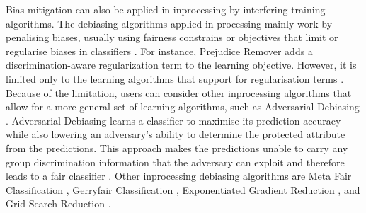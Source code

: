 \documentclass[sigconf,review]{acmart}
\begin{document}
	Bias mitigation can also be applied in inprocessing by interfering training algorithms. The debiasing algorithms applied in processing mainly work by penalising biases, usually using fairness constrains or objectives that limit or regularise biases in classifiers \cite{mahoney2020ai}. For instance, Prejudice Remover \cite{kamishima2012prejudice} adds a discrimination-aware regularization term to the learning objective. However, it is limited only to the learning algorithms that support for regularisation terms \cite{mahoney2020ai,ibmaif3602022guidance}. Because of the limitation, users can consider other inprocessing algorithms that allow for a more general set of learning algorithms, such as Adversarial Debiasing \cite{mahoney2020ai,ibmaif3602022guidance}. Adversarial Debiasing \cite{zhang2018adversarial} learns a classifier to maximise its prediction accuracy while also lowering an adversary's ability to determine the protected attribute from the predictions. This approach makes the predictions unable to carry any group discrimination information that the adversary can exploit and therefore leads to a fair classifier \cite{ibmaif3602022guidance}. Other inprocessing debiasing algorithms are Meta Fair Classification \cite{celis2019metafair}, Gerryfair Classification \cite{kearns2018gerry,kearns2019gerry}, Exponentiated Gradient Reduction \cite{agarwal18grid}, and Grid Search Reduction \cite{agarwal18grid,agarwal19grid}.
	
\end{document}
